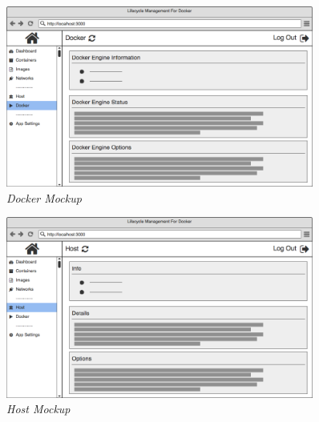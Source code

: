 \begin{figure}[!ht]
\centering
\includegraphics*[width=0.9\textwidth]{wireframes/docker}
\caption{\em Docker Mockup}
\end{figure}

\begin{figure}[!ht]
\centering
\includegraphics*[width=0.9\textwidth]{wireframes/host}
\caption{\em Host Mockup}
\end{figure}
